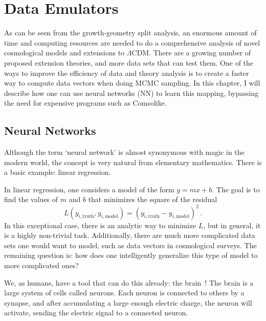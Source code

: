 \chapter{Data Emulators}
As can be seen from the growth-geometry split analysis, an enormous amount of time and computing resources are needed to do a comprehensive analysis of novel cosmological models and extensions to $\Lambda$CDM. There are a growing number of proposed extension theories, and more data sets that can test them. One of the ways to improve the efficiency of data and theory analysis is to create a faster way to compute data vectors when doing MCMC sampling. In this chapter, I will describe how one can use neural networks (NN) to learn this mapping, bypassing the need for expensive programs such as Comsolike.
\section{Neural Networks}
Although the term `neural network' is almost synonymous with magic in the modern world, the concept is very natural from elementary mathematics. There is a basic example: linear regression. 

In linear regression, one considers a model of the form $y=mx+b$. The goal is to find the values of $m$ and $b$ that minimizes the square of the residual
\begin{equation}
	L(y_{i,\mathrm{truth}},y_{i,\mathrm{model}}) = (y_{i,\mathrm{truth}} - y_{i,\mathrm{model}})^2\,.
\end{equation}
In this exceptional case, there is an analytic way to minimize $L$, but in general, it is a highly non-trivial task. Additionally, there are much more complicated data sets one would want to model, such as data vectors in cosmological surveys. The remaining question is: how does one intelligently generalize this type of model to more complicated ones?

We, as humans, have a tool that can do this already: the brain~\cite{noauthor_what_nodate}! The brain is a large system of cells called neurons. Each neuron is connected to others by a synapse, and after accumulating a large enough electric charge, the neuron will activate, sending the electric signal to a connected neuron. 

